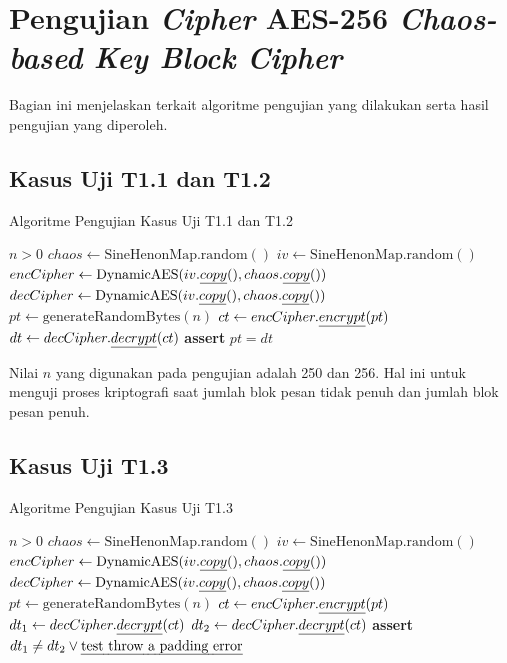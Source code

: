 \chapter{{{Pengujian \emph{Cipher} AES-256 \emph{Chaos-based Key Block Cipher}}}} 
\label{appendix:unit.test.cipher}

Bagian ini menjelaskan terkait algoritme pengujian yang dilakukan serta hasil pengujian yang diperoleh.

\section{Kasus Uji T1.1 dan T1.2}

\begin{algorithm}
  \caption{Algoritme Pengujian Kasus Uji T1.1 dan T1.2}
  \label{alg:unit.test.t1.1}
  \begin{algorithmic}
    \Require $n > 0$
    \State $chaos \gets \text{SineHenonMap.random}()$ 
    \State $iv \gets \text{SineHenonMap.random}()$
    \State $encCipher \gets \text{DynamicAES}(iv.\emph{copy}(), chaos.\emph{copy}())$
    \State $decCipher \gets \text{DynamicAES}(iv.\emph{copy}(), chaos.\emph{copy}())$
    \State
    \State $pt \gets \text{generateRandomBytes}(n)$ 
    \State $ct \gets encCipher.\emph{encrypt}(pt)$
    \State $dt \gets decCipher.\emph{decrypt}(ct)$
    \State
    \State \textbf{assert} $pt = dt$
  \end{algorithmic}
\end{algorithm}

Nilai $n$ yang digunakan pada pengujian adalah 250 dan 256. Hal ini untuk menguji proses kriptografi saat jumlah blok pesan tidak penuh dan jumlah blok pesan penuh. 

\section{Kasus Uji T1.3}

\begin{algorithm}
  \caption{Algoritme Pengujian Kasus Uji T1.3}
  \label{alg:unit.test.t1.3}
  \begin{algorithmic}
    \Require $n > 0$
    \State $chaos \gets \text{SineHenonMap.random}()$ 
    \State $iv \gets \text{SineHenonMap.random}()$
    \State $encCipher \gets \text{DynamicAES}(iv.\emph{copy}(), chaos.\emph{copy}())$
    \State $decCipher \gets \text{DynamicAES}(iv.\emph{copy}(), chaos.\emph{copy}())$
    \State
    \State $pt \gets \text{generateRandomBytes}(n)$ 
    \State $ct \gets encCipher.\emph{encrypt}(pt)$
    \State $dt_1 \gets decCipher.\emph{decrypt}(ct)$
    \State $dt_2 \gets decCipher.\emph{decrypt}(ct)$
    \State
    \State \textbf{assert} $dt_1 \ne dt_2 \lor \text{\emph{test throw a padding error}}$
  \end{algorithmic}
\end{algorithm}

